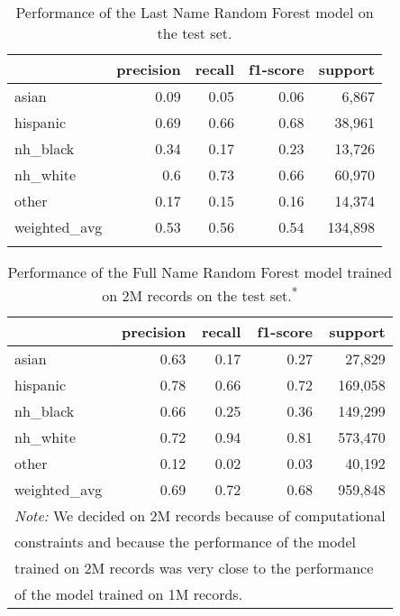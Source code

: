 \documentclass[12pt, letterpaper]{article}
\begin{document}
\begin{table}[h!]
\centering
\caption{Performance of the Last Name Random Forest model on the test set.}
\begin{tabular}{lrrrr}
\hline
              &   precision &   recall &   f1-score &   support \\
\hline
 asian        &        0.09 &     0.05 &       0.06 &      6,867 \\
 hispanic     &        0.69 &     0.66 &       0.68 &     38,961 \\
 nh\_black     &        0.34 &     0.17 &       0.23 &     13,726 \\
 nh\_white     &        0.6  &     0.73 &       0.66 &     60,970 \\
 other        &        0.17 &     0.15 &       0.16 &     14,374 \\
 weighted\_avg &        0.53 &     0.56 &       0.54 &    134,898 \\
\hline
\label{table:rf_last_name}
\end{tabular}
\end{table}

\begin{table}[h!]
\centering
\caption{Performance of the Full Name Random Forest model trained on 2M records on the test set.\textsuperscript{*}}
\begin{tabular}{lrrrr}
\hline
              &   precision &   recall &   f1-score &   support \\
\hline
 asian        &      0.63  &    0.17   &   0.27  &   27,829\\
 hispanic     &        0.78 &     0.66 &       0.72 &    169,058 \\
 nh\_black     &        0.66 &     0.25 &       0.36 &    149,299 \\
 nh\_white     &        0.72 &     0.94 &       0.81 &    573,470 \\
 other        &        0.12 &     0.02 &       0.03 &     40,192 \\
 weighted\_avg &        0.69 &     0.72 &       0.68 &    959,848 \\
\hline
\multicolumn{5}{l}{\textit{Note:} We decided on 2M records because of computational}\\
\multicolumn{5}{l}{constraints and because the performance of the model}\\
\multicolumn{5}{l}{trained on 2M records was very close to the performance}\\
\multicolumn{5}{l}{of the model trained on 1M records.}
\end{tabular}
\label{table:rf_full_name_2m}
\end{table}
\end{document}
